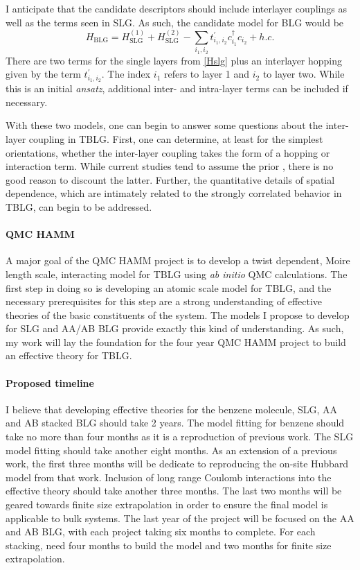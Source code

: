 \documentclass[12pt]{article}
\begin{document}
I anticipate that the candidate descriptors should include interlayer couplings as well as the terms seen in SLG.
As such, the candidate model for BLG would be
\begin{equation}
H_\text{BLG} = H_\text{SLG}^{(1)} + H_\text{SLG}^{(2)} - \sum_{i_1, i_2} t_{i_1, i_2}^\prime c_{i_1}^\dagger c_{i_2} + h.c.
\label{Hblg}
\end{equation}
There are two terms for the single layers from \eqref{Hslg} plus an interlayer hopping given by the term $t_{i_1, i_2}^\prime.$  
The index $i_1$ refers to layer 1 and $i_2$ to layer two.
While this is an initial \textit{ansatz}, additional inter- and intra-layer terms can be included if necessary.

With these two models, one can begin to answer some questions about the inter-layer coupling in TBLG.
First, one can determine, at least for the simplest orientations, whether the inter-layer coupling takes the form of a hopping or interaction term.
While current studies tend to assume the prior \cite{Fang, Fang2016, PhysRevX.8.031088, PhysRevX.8.031087}, there is no good reason to discount the latter.
Further, the quantitative details of spatial dependence, which are intimately related to the strongly correlated behavior in TBLG, can begin to be addressed.

\vspace{-10pt}
\paragraph{QMC HAMM}
A major goal of the QMC HAMM project is to develop a twist dependent, Moire length scale, interacting model for TBLG using \textit{ab initio} QMC calculations.
The first step in doing so is developing an atomic scale model for TBLG, and the necessary prerequisites for this step are a strong understanding of effective theories of the basic constituents of the system.
The models I propose to develop for SLG and AA/AB BLG provide exactly this kind of understanding.
As such, my work will lay the foundation for the four year QMC HAMM project to build an effective theory for TBLG.

\vspace{-10pt}
\paragraph{Proposed timeline} I believe that developing effective theories for the benzene molecule, SLG, AA and AB stacked BLG should take 2 years. 
The model fitting for benzene should take no more than four months as it is a reproduction of previous work.
The SLG model fitting should take another eight months.
As an extension of a previous work, the first three months will be dedicate to reproducing the on-site Hubbard model from that work.
Inclusion of long range Coulomb interactions into the effective theory should take another three months.
The last two months will be geared towards finite size extrapolation in order to ensure the final model is applicable to bulk systems.
The last year of the project will be focused on the AA and AB BLG, with each project taking six months to complete.
For each stacking, need four months to build the model and two months for finite size extrapolation.
\end{document}
